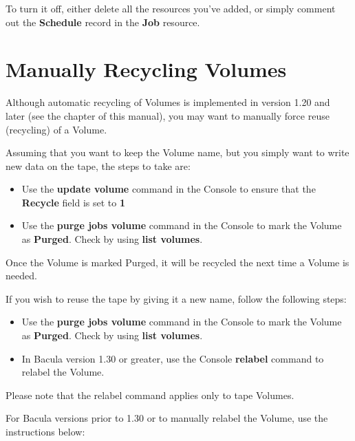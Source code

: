 To turn it off, either delete all the resources you've added, or simply
comment out the {\bf Schedule} record in the {\bf Job} resource. 

\section{Manually Recycling Volumes}
\label{manualrecycling}

Although automatic recycling of Volumes is implemented in version 1.20 and
later (see the 
 chapter of
this manual), you may want to manually force reuse (recycling) of a Volume. 

Assuming that you want to keep the Volume name, but you simply want to write
new data on the tape, the steps to take are: 

\begin{itemize}
\item Use the {\bf update volume} command in the Console to  ensure that the
   {\bf Recycle} field is set to {\bf 1}  
\item Use the {\bf purge jobs volume} command in the Console  to mark the
   Volume as {\bf Purged}. Check by using  {\bf list volumes}. 
\end{itemize}

Once the Volume is marked Purged, it will be recycled the next time a Volume
is needed. 

If you wish to reuse the tape by giving it a new name, follow the following
steps: 

\begin{itemize}
\item Use the {\bf purge jobs volume} command in the Console  to mark the
   Volume as {\bf Purged}. Check by using  {\bf list volumes}.  
\item In Bacula version 1.30 or greater, use the Console  {\bf relabel}
   command to relabel the Volume. 
\end{itemize}

Please note that the relabel command applies only to tape Volumes. 

For Bacula versions prior to 1.30 or to manually relabel the Volume, use the
instructions below: 

